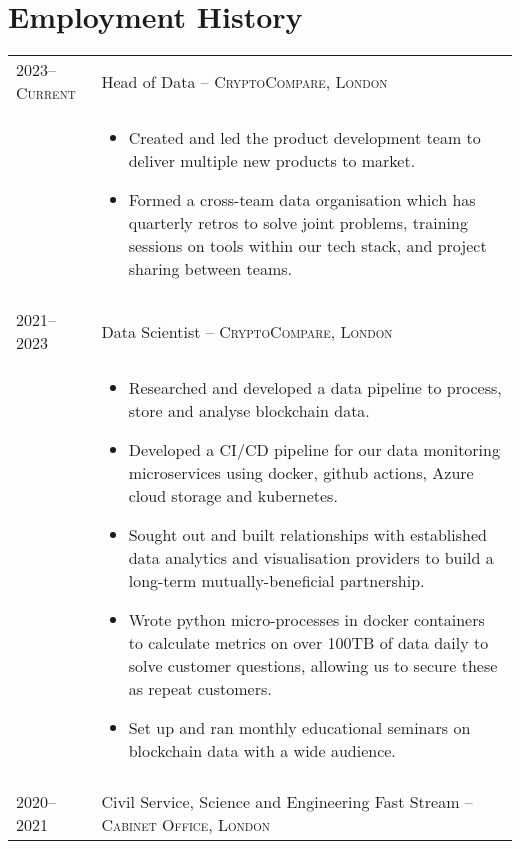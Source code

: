 \documentclass[a4paper,10pt]{article}
\begin{document}
\section{Employment History}
\begin{tabular}{p{2.25cm}|p{15cm}}
%
%
\textsc{2023--Current} & \large{Head of Data -- \textsc{CryptoCompare, London}}\\
	& \vspace{-0.07 in}\begin{itemize}
		\item Created and led the product development team to deliver multiple new products to market.
		\item Formed a cross-team data organisation which has quarterly retros to solve joint problems, training sessions on tools within our tech stack, and project sharing between teams.
	\end{itemize}\vspace{-0.15 in}\\
\multicolumn{2}{c}{}\\
	\textsc{2021--2023} & \large{Data Scientist -- \textsc{CryptoCompare, London}}\\
	 & \vspace{-0.07 in}\begin{itemize}
	 	\item Researched and developed a data pipeline to process, store and analyse blockchain data.
		\item Developed a CI/CD pipeline for our data monitoring microservices using docker, github actions, Azure cloud storage and kubernetes.
		\item Sought out and built relationships with established data analytics and visualisation providers to build a long-term mutually-beneficial partnership.
		\item Wrote python micro-processes in docker containers to calculate metrics on over 100TB of data daily to solve customer questions, allowing us to secure these as repeat customers.
		\item Set up and ran monthly educational seminars on blockchain data with a wide audience.
	\end{itemize}\vspace{-0.15 in}\\
\multicolumn{2}{c}{}\\
%
%
	\textsc{2020--2021} & \large{Civil Service, Science and Engineering Fast Stream -- \textsc{Cabinet Office, London}}\\

\end{tabular}
\end{document}
